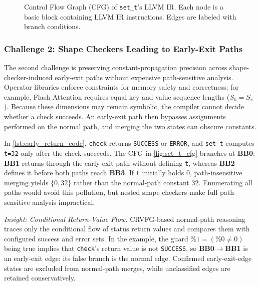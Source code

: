 \begin{figure}[htbp]
\begin{minipage}{0.47\textwidth}
		\caption{Control Flow Graph (CFG) of \texttt{set\_t}'s LLVM IR. Each node is a basic block containing LLVM IR instructions. Edges are labeled with branch conditions.}
		\label{fig:set_t_cfg}
	\end{minipage}
\end{figure}

\subsubsection{Challenge 2: Shape Checkers Leading to Early-Exit Paths}

The second challenge is preserving constant-propagation precision across shape-checker-induced early-exit paths without expensive path-sensitive analysis.
Operator libraries enforce constraints for memory safety and correctness; for example, Flash Attention requires equal key and value sequence lengths ($S_k=S_v$).
Because these dimensions may remain symbolic, the compiler cannot decide whether a check succeeds.
An early-exit path then bypasses assignments performed on the normal path, and merging the two states can obscure constants.

In \autoref{lst:early_return_code}, \texttt{check} returns \texttt{SUCCESS} or \texttt{ERROR}, and \texttt{set\_t} computes \texttt{t=32} only after the check succeeds.
The CFG in \autoref{fig:set_t_cfg} branches at \textbf{BB0}: \textbf{BB1} returns through the early-exit path without defining \texttt{t}, whereas \textbf{BB2} defines it before both paths reach \textbf{BB3}.
If \texttt{t} initially holds 0, path-insensitive merging yields $\{0,32\}$ rather than the normal-path constant 32.
Enumerating all paths would avoid this pollution, but nested shape checkers make full path-sensitive analysis impractical.

\textit{Insight: Conditional Return-Value Flow.}
CRVFG-based normal-path reasoning traces only the conditional flow of status return values and compares them with configured success and error sets.
In the example, the guard $\%1=(\%0\neq0)$ being true implies that \texttt{check}'s return value is not \texttt{SUCCESS}, so \textbf{BB0}$\rightarrow$\textbf{BB1} is an early-exit edge; its false branch is the normal edge.
Confirmed early-exit-edge states are excluded from normal-path merges, while unclassified edges are retained conservatively.
